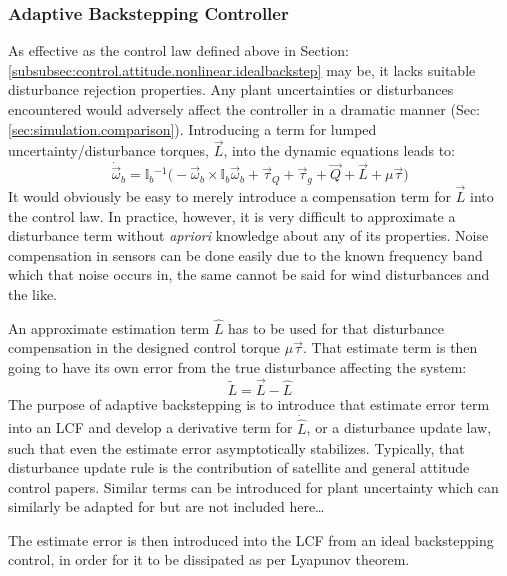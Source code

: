 {\subsubsection{Adaptive Backstepping Controller}
\label{subsubsec:control.attitude.nonlinear.adaptivebackstep}
As effective as the control law defined above in Section:\ref{subsubsec:control.attitude.nonlinear.idealbackstep} may be, it lacks suitable disturbance rejection properties. Any plant uncertainties or disturbances encountered would adversely affect the controller in a dramatic manner (Sec:\ref{sec:simulation.comparison}). Introducing a term for lumped uncertainty/disturbance torques, $\vec{L}$, into the dynamic equations leads to:
\begin{equation}
\dot{\vec{\omega}}_b=\mathbb{I}_b\text{}^{-1}\big(-\vec{\omega}_b\times\mathbb{I}_b\vec{\omega}_b+\vec{\tau}_Q+\vec{\tau}_g+\vec{Q}+\vec{L}+\mu\vec{\tau}\big)
\end{equation}
It would obviously be easy to merely introduce a compensation term for $\vec{L}$ into the control law. In practice, however, it is very difficult to approximate a disturbance term without \emph{apriori} knowledge about any of its properties. Noise compensation in sensors can be done easily due to the known frequency band which that noise occurs in, the same cannot be said for wind disturbances and the like.
\par
An approximate estimation term $\hat{L}$ has to be used for that disturbance compensation in the designed control torque $\mu\vec{\tau}$. That estimate term is then going to have its own error from the true disturbance affecting the system:
\begin{equation}\label{eq:estimate-error}
\widetilde{L}=\vec{L}-\hat{L}
\end{equation}
The purpose of adaptive backstepping is to introduce that estimate error term into an LCF and develop a derivative term for $\dot{\hat{L}}$, or a disturbance update law, such that even the estimate error asymptotically stabilizes. Typically, that disturbance update rule is the contribution of satellite and general attitude control papers. Similar terms can be introduced for plant uncertainty which can similarly be adapted for but are not included here\ldots
\par
The estimate error is then introduced into the LCF from an ideal backstepping control, in order for it to be dissipated as per Lyapunov theorem.
\begin{subequations}

\end{subequations}}
